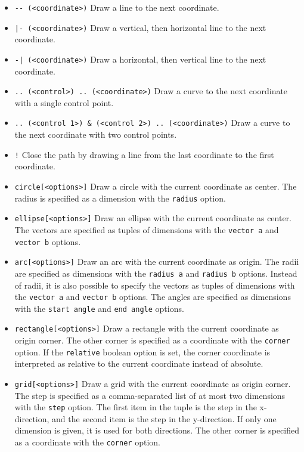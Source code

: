 \documentclass{article}
\begin{document}
\begin{itemize}
    \item \verb|-- (<coordinate>)| Draw a line to the next coordinate.
    \item \verb#|- (<coordinate>)# Draw a vertical, then horizontal line to the next coordinate.
    \item \verb#-| (<coordinate>)# Draw a horizontal, then vertical line to the next coordinate.
    \item \verb|.. (<control>) .. (<coordinate>)| Draw a curve to the next coordinate with a single control point.
    \item \verb|.. (<control 1>) & (<control 2>) .. (<coordinate>)| Draw a curve to the next coordinate with two control points. 
    \item \verb|!| Close the path by drawing a line from the last coordinate to the first coordinate.
\end{itemize}

\begin{itemize}
    \item \verb|circle[<options>]| Draw a circle with the current coordinate as center. The radius is specified as a dimension with the \verb|radius| option.
    \item \verb|ellipse[<options>]| Draw an ellipse with the current coordinate as center. The vectors are specified as tuples of dimensions with the \verb|vector a| and \verb|vector b| options.
    \item \verb|arc[<options>]| Draw an arc with the current coordinate as origin. The radii are specified as dimensions with the \verb|radius a| and \verb|radius b| options. Instead of radii, it is also possible to specify the vectors as tuples of dimensions with the \verb|vector a| and \verb|vector b| options. The angles are specified as dimensions with the \verb|start angle| and \verb|end angle| options.
    \item \verb|rectangle[<options>]| Draw a rectangle with the current coordinate as origin corner. The other corner is specified as a coordinate with the \verb|corner| option. If the \verb|relative| boolean option is set, the corner coordinate is interpreted as relative to the current coordinate instead of absolute.
    \item \verb|grid[<options>]| Draw a grid with the current coordinate as origin corner. The step is specified as a comma-separated list of at most two dimensions with the \verb|step| option. The first item in the tuple is the step in the x-direction, and the second item is the step in the y-direction. If only one dimension is given, it is used for both directions. The other corner is specified as a coordinate with the \verb|corner| option. 
\end{itemize}
\end{document}
